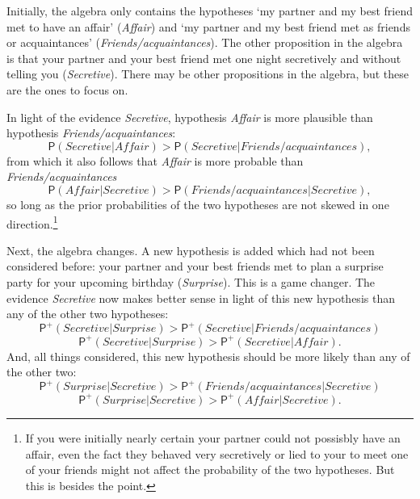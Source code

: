 \documentclass[
  11pt,
  dvipsnames,enabledeprecatedfontcommands]{scrartcl}
\newcommand{\pr}[1]{\ensuremath{\mathsf{P}(#1)}}
\newcommand{\ppr}[2]{\ensuremath{\mathsf{P}^{#1}(#2)}}
\begin{document}
Initially, the algebra only contains the hypotheses `my partner and my
best friend met to have an affair' (\textit{Affair}) and `my partner and
my best friend met as friends or acquaintances'
(\textit{Friends/acquaintances}). The other proposition in the algebra
is that your partner and your best friend met one night secretively and
without telling you (\textit{Secretive}). There may be other
propositions in the algebra, but these are the ones to focus on.

In light of the evidence \textit{Secretive}, hypothesis \textit{Affair}
is more plausible than hypothesis \textit{Friends/acquaintances}:
\[\pr{ \textit{Secretive} \vert \textit{Affair}}> \pr{\textit{Secretive} \vert \textit{Friends/acquaintances}},\]
from which it also follows that \textit{Affair} is more probable than
\textit{Friends/acquaintances}
\[\pr{\textit{Affair} \vert  \textit{Secretive} }> \pr{\textit{Friends/acquaintances} \vert \textit{Secretive}}, \tag{>}\]
so long as the prior probabilities of the two hypotheses are not skewed
in one direction.\footnote{If you were initially nearly certain your
  partner could not possisbly have an affair, even the fact they behaved
  very secretively or lied to your to meet one of your friends might not
  affect the probability of the two hypotheses. But this is besides the
  point.}

Next, the algebra changes. A new hypothesis is added which had not been
considered before: your partner and your best friends met to plan a
surprise party for your upcoming birthday (\textit{Surprise}). This is a
game changer. The evidence \textit{Secretive} now makes better sense in
light of this new hypothesis than any of the other two hypotheses:
\[\ppr{+}{ \textit{Secretive} \vert \textit{Surprise}}> \ppr{+}{\textit{Secretive} \vert \textit{Friends/acquaintances}}\]
\[\ppr{+}{ \textit{Secretive} \vert \textit{Surprise}}> \ppr{+}{\textit{Secretive} \vert \textit{Affair}}.\]
And, all things considered, this new hypothesis should be more likely
than any of the other two:
\[\ppr{+}{ \textit{Surprise} \vert \textit{Secretive}}> \ppr{+}{ \textit{Friends/acquaintances} \vert \textit{Secretive} }\]
\[\ppr{+}{ \textit{Surprise} \vert \textit{Secretive}}> \ppr{+}{ \textit{Affair} \vert \textit{Secretive}}. \tag{*}\]
\end{document}
